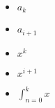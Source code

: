 \documentclass{article}
\begin{document}
    \begin{itemize}
      \item $a_k$
      \item $a_{i+1}$
      \item $x^k$
      \item $x^{i+1}$
      \item $\int_{n=0}^{k} x$
    \end{itemize}
\end{document}
